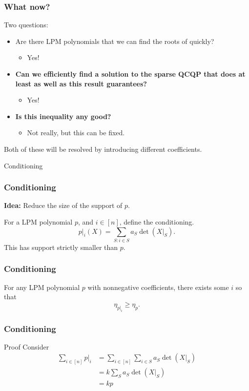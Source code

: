 \documentclass{beamer}
\begin{document}
\begin{frame}
    \frametitle{What now?}
    Two questions:
    \begin{itemize}
        \item Are there LPM polynomials that we can find the roots of quickly?
            \begin{itemize}
                \item Yes!
            \end{itemize}
        \item \textbf{Can we efficiently find a solution to the sparse QCQP that does at least as well as this result guarantees?}
             {
            \begin{itemize}
                \item Yes!
            \end{itemize}
            }
        \item \textbf{Is this inequality any good?}
             {
            \begin{itemize}
                \item Not really, but this can be fixed.
            \end{itemize}
            }
    \end{itemize}
    \pause
    Both of these will be resolved by introducing different coefficients.
\end{frame}
\begin{frame}
    \centering
    \huge
    {\color{gray}Conditioning}
\end{frame}
\begin{frame}
    \frametitle{Conditioning}
    \textbf{Idea:} Reduce the size of the support of $p$.

    For a LPM polynomial $p$, and $i \in [n]$, define the conditioning.
    \[
        p|_i(X) = \sum_{S : i \in S} a_S \det(X|_S).
    \]
    This has support strictly smaller than $p$.
\end{frame}
\begin{frame}
    \frametitle{Conditioning}
    \begin{theorem}
    For any LPM polynomial $p$ with nonnegative coefficients, there exists some $i$ so that
    \[
        \eta_{p|_i} \ge \eta_{p}.
    \]
    \end{theorem}
\end{frame}
\begin{frame}
    \frametitle{Conditioning}
    \begin{block}{Proof}
    Consider
        \begin{align*} 
        \sum_{i \in [n]} p|_{i}&=\sum_{i \in [n]} \sum_{i \in  S} a_S \det(X|_S)\\
                &=k\sum_{S} a_S \det(X|_S)\\
                &=kp
        \end{align*}
    \end{block}
\end{frame}
\end{document}
